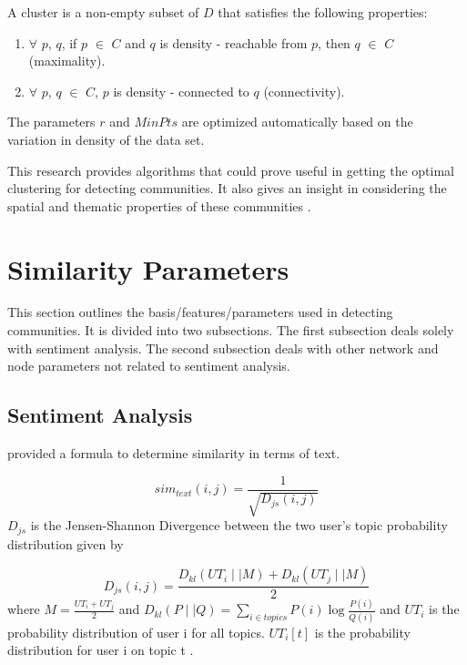 A cluster is a non-empty subset of $D$ that satisfies the following properties:
\begin{enumerate}
	\item $\forall$ $p$, $q$, if $p$ $\in$ $C$ and $q$ is density - reachable from $p$, then $q$ $\in$ $C$ (maximality).
	\item $\forall$ $p$, $q$ $\in$ $C$, $p$ is density - connected to $q$ (connectivity).
\end{enumerate}


The parameters $r$ and $MinPts$ are optimized automatically based on the variation in density of the data set.


This research provides algorithms that could prove useful in getting the optimal clustering for detecting communities. It also gives an insight in considering the spatial and thematic properties of these communities \cite{Bakillah:2014}.


\section{Similarity Parameters}
This section outlines the basis/features/parameters used in detecting communities. It is divided into two subsections. The first subsection deals solely with sentiment analysis. The second subsection deals with other network and node parameters not related to sentiment analysis. 


\subsection{Sentiment Analysis}
\label{subsec:sentiana}


 provided a formula to determine similarity in terms of text. 


\begin{equation}
	sim_{text}(i,j) = \frac{1}{\sqrt{D_{js}(i,j)}}
\end{equation}$D_{js}$ is the Jensen-Shannon Divergence between the two user’s topic probability distribution given by


\begin{equation}
	D_{js}(i,j) = \frac{D_{kl}(UT_i \mid\mid M) + D_{kl}(UT_j \mid\mid M)}{2}
\end{equation}where $M = \frac{UT_i + UT_j}{2}$ and $D_{kl}(P \mid\mid Q) = \sum_{i \in topics} P(i) \log{\frac{P(i)}{Q(i)}}$ and $UT_i$ is the probability distribution of user i for all topics. $UT_i[t]$ is the probability distribution for user i on topic t \cite{Zhang:2012}.


